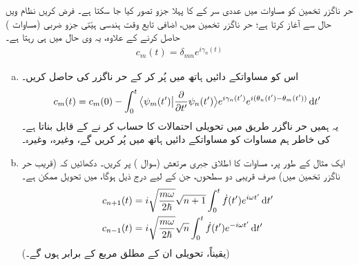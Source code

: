 حر ناگزر تخمین کو مساوات  میں عددی سر  کے  کا پہلا جزو تصور کیا جا سکتا ہے۔ فرض کریں نظام  ویں حال سے آغاز کرتا ہے؛ حر ناگزر تخمین میں، اضافی تابع وقت ہندسی ہیّتی جزو ضربی (مساوات ) حاصل کرنے کے علاوہ، یہ  وی حال میں ہی رہتا ہے۔
\begin{align*} 
c_m (t) = \delta_{mn} e^{i \gamma_n (t)}
\end{align*} 
\begin{enumerate}[a.]
\item
اس کو مساواتکے دائیں ہاتھ میں پُر کر کے حر ناگزر کی  حاصل کریں۔
\begin{align}\label{مساوات_حر_آخری_سوال}
c_m (t) = c_m (0) - \int_0^t \big\langle \psi_m (t') \big | \frac{\partial}{\partial t'} \psi_n (t') \big \rangle e^{i \gamma_n (t')} e^{i (\theta_n (t') - \theta_m (t'))} \dif t'
\end{align}
یہ ہمیں  حر ناگزر طریق میں تحویلی احتمالات کا حساب کر نے کے قابل بناتا ہے۔ کی خاطر ہم مساوات کو مساواتکے دائیں ہاتھ میں پُر کریں گے، وغیرہ، وغیرہ۔ 
\item
ایک مثال کے طور پر، مساوات کا اطلاق جبری مرتعش (سوال ) پر کریں۔ دکھائیں کہ (قریب حر ناگزر تخمین میں) صرف قریبی دو سطحوں، جن کے لیے درج ذیل ہوگا، میں تحویل ممکن ہے۔ 
\begin{align*}
c_{n + 1} (t)& = i \sqrt{\frac{m \omega}{2 \hslash}} \sqrt{n + 1} \int_0^t \dot{f} (t') e^{i \omega t'} \dif t' \\
c_{n - 1} (t) &= i \sqrt{\frac{m \omega}{2 \hslash}} \sqrt{n} \int_0^t \dot{f} (t') e^{-i \omega t'} \dif t'
\end{align*}
(یقیناً، تحویلی  ان کے مطلق مربع کے برابر ہوں گے۔) 
\end{enumerate}

